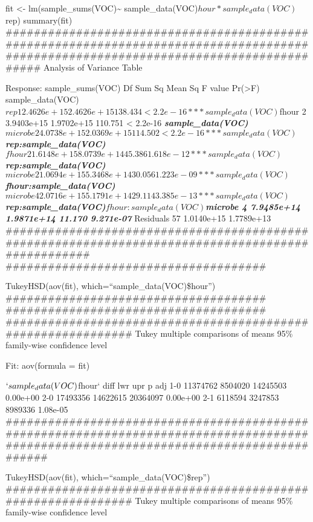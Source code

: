\documentclass[]{article}
\begin{document}
fit \textless{}- lm(sample\_sums(VOC)\textasciitilde{}
sample\_data(VOC)\(hour*sample_data(VOC)\)rep) summary(fit)
\#\#\#\#\#\#\#\#\#\#\#\#\#\#\#\#\#\#\#\#\#\#\#\#\#\#\#\#\#\#\#\#\#\#\#\#\#\#\#\#\#\#\#\#\#\#\#\#\#\#\#\#\#\#\#\#\#\#\#\#\#\#\#\#\#\#\#\#\#\#\#\#\#\#\#\#\#\#\#\#\#\#\#\#\#\#\#\#\#\#\#\#\#\#\#\#\#\#\#\#\#\#\#\#\#\#\#\#\#\#\#\#\#\#\#\#\#\#\#\#\#\#\#\#\#\#\#\#\#\#\#\#\#\#
Analysis of Variance Table

Response: sample\_sums(VOC) Df Sum Sq Mean Sq F value
Pr(\textgreater{}F)\\
sample\_data(VOC)\(rep 1 2.4626e+15 2.4626e+15 138.434 < 2.2e-16 *** sample_data(VOC)\)fhour
2 3.9403e+15 1.9702e+15 110.751 \textless{} 2.2e-16 \textbf{\emph{
sample\_data(VOC)\(microbe 2 4.0738e+15 2.0369e+15 114.502 < 2.2e-16 *** sample_data(VOC)\)rep:sample\_data(VOC)\(fhour 2 1.6148e+15 8.0739e+14 45.386 1.618e-12 *** sample_data(VOC)\)rep:sample\_data(VOC)\(microbe 2 1.0694e+15 5.3468e+14 30.056 1.223e-09 *** sample_data(VOC)\)fhour:sample\_data(VOC)\(microbe 4 2.0716e+15 5.1791e+14 29.114 3.385e-13 *** sample_data(VOC)\)rep:sample\_data(VOC)\(fhour:sample_data(VOC)\)microbe
4 7.9485e+14 1.9871e+14 11.170 9.271e-07 }} Residuals 57 1.0140e+15
1.7789e+13\\
\#\#\#\#\#\#\#\#\#\#\#\#\#\#\#\#\#\#\#\#\#\#\#\#\#\#\#\#\#\#\#\#\#\#\#\#\#\#\#\#\#\#\#\#\#\#\#\#\#\#\#\#\#\#\#\#\#\#\#\#\#\#\#\#\#\#\#\#\#\#\#\#\#\#\#\#\#\#\#\#\#\#\#\#\#\#\#\#\#\#\#\#\#\#\#\#\#\#
\#\#\#\#\#\#\#\#\#\#\#\#\#\#\#\#\#\#\#\#\#\#\#\#\#\#\#\#\#\#\#\#\#\#\#\#\#

TukeyHSD(aov(fit), which=``sample\_data(VOC)\$hour'')
\#\#\#\#\#\#\#\#\#\#\#\#\#\#\#\#\#\#\#\#\#\#\#\#\#\#\#\#\#\#\#\#\#\#\#\#\#
\#\#\#\#\#\#\#\#\#\#\#\#\#\#\#\#\#\#\#\#\#\#\#\#\#\#\#\#\#\#\#\#\#\#\#\#\#
\#\#\#\#\#\#\#\#\#\#\#\#\#\#\#\#\#\#\#\#\#\#\#\#\#\#\#\#\#\#\#\#\#\#\#\#\#\#\#\#\#\#\#\#\#\#\#\#\#\#\#\#\#\#\#\#\#\#\#\#\#
Tukey multiple comparisons of means 95\% family-wise confidence level

Fit: aov(formula = fit)

\(`sample_data(VOC)\)fhour` diff lwr upr p adj 1-0 11374762 8504020
14245503 0.00e+00 2-0 17493356 14622615 20364097 0.00e+00 2-1 6118594
3247853 8989336 1.08e-05
\#\#\#\#\#\#\#\#\#\#\#\#\#\#\#\#\#\#\#\#\#\#\#\#\#\#\#\#\#\#\#\#\#\#\#\#\#\#\#\#\#\#\#\#\#\#\#\#\#\#\#\#\#\#\#\#\#\#\#\#\#\#\#\#\#\#\#\#\#\#\#\#\#\#\#\#\#\#\#\#\#\#\#\#\#\#\#\#\#\#\#\#\#\#\#\#\#\#\#\#\#\#\#\#\#\#\#\#\#\#\#\#\#\#\#\#\#\#\#\#\#\#\#\#\#\#\#\#\#\#\#\#\#\#\#

TukeyHSD(aov(fit), which=``sample\_data(VOC)\$rep'')
\#\#\#\#\#\#\#\#\#\#\#\#\#\#\#\#\#\#\#\#\#\#\#\#\#\#\#\#\#\#\#\#\#\#\#\#\#\#\#\#\#\#\#\#\#\#\#\#\#\#\#\#\#\#\#\#\#\#\#\#\#
Tukey multiple comparisons of means 95\% family-wise confidence level
\end{document}
